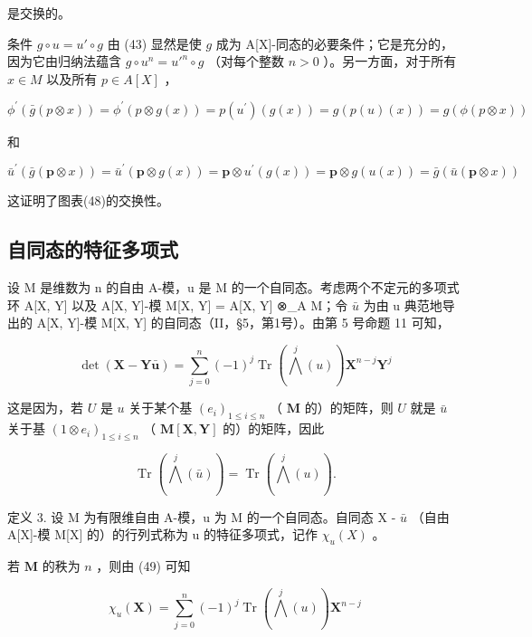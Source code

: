 是交换的。

条件 \(g \circ u = u' \circ g\) 由 (43) 显然是使 \(g\) 成为 A{[}X{]}-同态的必要条件；它是充分的，因为它由归纳法蕴含 \(g \circ u^n = u'^n \circ g\) （对每个整数 \(n > 0\) ）。另一方面，对于所有 \(x \in M\) 以及所有 \(p \in A[X]\) ，

\[
\phi^ {\prime} (\bar {g} (p \otimes x)) = \phi^ {\prime} (p \otimes g (x)) = p (u ^ {\prime}) (g (x)) = g (p (u) (x)) = g (\phi (p \otimes x))
\]

和

\[
\bar {u} ^ {\prime} (\bar {g} (\boldsymbol {p} \otimes x)) = \bar {u} ^ {\prime} (\boldsymbol {p} \otimes g (x)) = \boldsymbol {p} \otimes u ^ {\prime} (g (x)) = \boldsymbol {p} \otimes g (u (x)) = \bar {g} (\bar {u} (\boldsymbol {p} \otimes x))
\]

这证明了图表(48)的交换性。

\subsection{自同态的特征多项式}

设 M 是维数为 n 的自由 A-模，u 是 M 的一个自同态。考虑两个不定元的多项式环 A{[}X, Y{]} 以及 A{[}X, Y{]}-模 M{[}X, Y{]} = A{[}X, Y{]} ⊗\_A M；令 \(\bar{u}\) 为由 u 典范地导出的 A{[}X, Y{]}-模 M{[}X, Y{]} 的自同态（II，§5，第1号）。由第 5 号命题 11 可知，

\[
\det (\mathbf {X} - \mathbf {Y} \bar {\boldsymbol {u}}) = \sum_ {j = 0} ^ {n} (- 1) ^ {j} \operatorname{Tr} \left(\bigwedge^ {j} (u)\right) \mathbf {X} ^ {n - j} \mathbf {Y} ^ {j}\tag{49}
\]

这是因为，若 \(U\) 是 \(u\) 关于某个基 \((e_i)_{1 \leqslant i \leqslant n}\) （ \(\mathbf{M}\) 的）的矩阵，则 \(U\) 就是 \(\bar{u}\) 关于基 \((1 \otimes e_i)_{1 \leqslant i \leqslant n}\) （ \(\mathbf{M}[\mathbf{X}, \mathbf{Y}]\) 的）的矩阵，因此

\[
\operatorname{Tr} \left(\bigwedge^ {j} (\bar {u})\right) = \operatorname{Tr} \left(\bigwedge^ {j} (u)\right).
\]

定义 3. 设 M 为有限维自由 A-模，u 为 M 的一个自同态。自同态 X - \(\bar{u}\) （自由 A{[}X{]}-模 M{[}X{]} 的）的行列式称为 u 的特征多项式，记作 \(\chi_u(X)\) 。

若 \(\mathbf{M}\) 的秩为 \(n\) ，则由 (49) 可知

\[
\chi_ {u} (\mathbf {X}) = \sum_ {j = 0} ^ {n} (- 1) ^ {j} \operatorname{Tr} \left(\bigwedge^ {j} (u)\right) \mathbf {X} ^ {n - j}\tag{50}
\]

